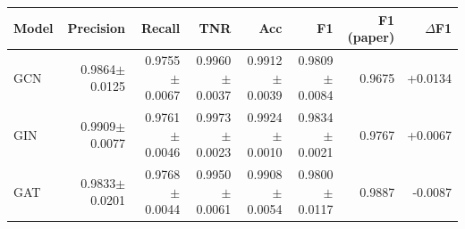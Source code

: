 \begin{tabular}{@{}lrrrrrrr@{}}
\toprule
Model & Precision & Recall & TNR & Acc & F1 & F1 (paper) & $\Delta$F1 \\ \midrule
GCN & 0.9864$\pm$0.0125 & 0.9755$\pm$0.0067 & 0.9960$\pm$0.0037 & 0.9912$\pm$0.0039 & 0.9809$\pm$0.0084 & 0.9675 & +0.0134 \\
GIN & 0.9909$\pm$0.0077 & 0.9761$\pm$0.0046 & 0.9973$\pm$0.0023 & 0.9924$\pm$0.0010 & 0.9834$\pm$0.0021 & 0.9767 & +0.0067 \\
GAT & 0.9833$\pm$0.0201 & 0.9768$\pm$0.0044 & 0.9950$\pm$0.0061 & 0.9908$\pm$0.0054 & 0.9800$\pm$0.0117 & 0.9887 & -0.0087 \\
\bottomrule
\end{tabular}
